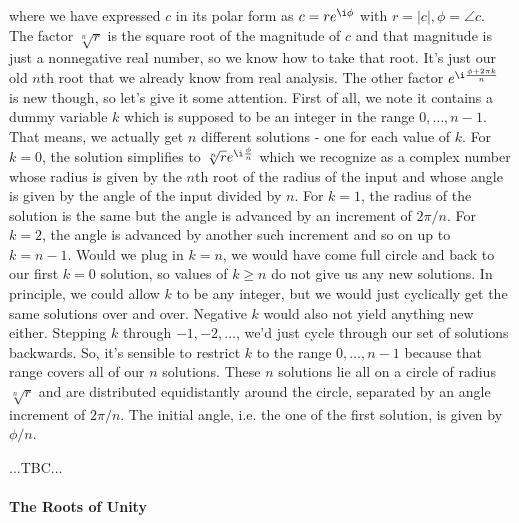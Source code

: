 where we have expressed $c$ in its polar form as $c = r e^{\i \phi}$ with $r = |c|, \phi = \angle c$. The factor $\sqrt[n]{r}$ is the square root of the magnitude of $c$ and that magnitude is just a nonnegative real number, so we know how to take that root. It's just our old $n$th root that we already know from real analysis. The other factor $e^{\i \frac{\phi + 2 \pi k}{n}}$ is new though, so let's give it some attention. First of all, we note it contains a dummy variable $k$ which is supposed to be an integer in the range $0,\ldots,n-1$. That means, we actually get $n$ different solutions - one for each value of $k$. For $k = 0$, the solution simplifies to $\sqrt[n]{r} e^{\i \frac{\phi}{n}}$ which we recognize as a complex number whose radius is given by the $n$th root of the radius of the input and whose angle is given by the angle of the input divided by $n$. For $k=1$, the radius of the solution is the same but the angle is advanced by an increment of $2\pi / n$. For $k=2$, the angle is advanced by another such increment and so on up to $k=n-1$. Would we plug in $k=n$, we would have come full circle and back to our first $k=0$ solution, so values of $k \geq n$ do not give us any new solutions. In principle, we could allow $k$ to be any integer, but we would just cyclically get the same solutions over and over. Negative $k$ would also not yield anything new either. Stepping $k$ through $-1,-2,\ldots$, we'd just cycle through our set of solutions backwards. So, it's sensible to restrict $k$ to the range $0,\ldots,n-1$ because that range covers all of our $n$ solutions. These $n$ solutions lie all on a circle of radius $\sqrt[n]{r}$ and are distributed equidistantly around the circle, separated by an angle increment of $2 \pi / n$. The initial angle, i.e. the one of the first solution, is given by $\phi / n$.

%
...TBC...

\paragraph{The Roots of Unity}









